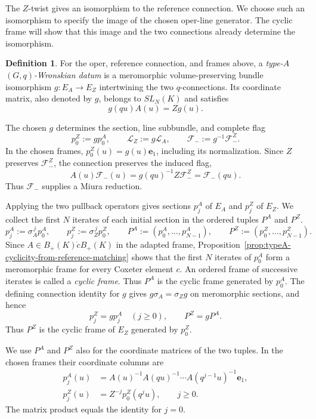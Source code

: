 \documentclass[11pt,leqno]{amsart}
\numberwithin{equation}{section}
\theoremstyle{plain}
\theoremstyle{definition}
\newtheorem{definition}[theorem]{Definition}
\theoremstyle{plain}
\theoremstyle{definition}
\theoremstyle{remark}
\begin{document}
The $Z$-twist gives an isomorphism to the reference connection. We choose such an isomorphism to specify the image of the chosen oper-line generator. The cyclic frame will show that this image and the two connections already determine the isomorphism.

\begin{definition}\label{def:typeA-universal-Wronskian}
For the oper, reference connection, and frames above, a \emph{type-$A$ $(G,q)$-Wronskian datum} is a meromorphic volume-preserving bundle isomorphism $g:E_A\to E_Z$ intertwining the two $q$-connections. Its coordinate matrix, also denoted by $g$, belongs to $SL_N(K)$ and satisfies
\[
 g(qu)A(u)=Zg(u).
\]
\end{definition}
The chosen $g$ determines the section, line subbundle, and complete flag
\[
 p_0^Z:=g p_0^A,\qquad \mathcal L_Z:=g\mathcal L_A,
 \qquad \mathcal F_-:=g^{-1}\mathcal F_-^Z.
\]
In the chosen frames, $p_0^Z(u)=g(u)\mathbf e_1$, including its normalization. Since $Z$ preserves $\mathcal F_-^Z$, the connection preserves the induced flag,
\[
 A(u)\mathcal F_-(u)=g(qu)^{-1}Z\mathcal F_-^Z
                  =\mathcal F_-(qu).
\]
Thus $\mathcal F_-$ supplies a Miura reduction.

Applying the two pullback operators gives sections $p_j^A$ of $E_A$ and $p_j^Z$ of $E_Z$. We collect the first $N$ iterates of each initial section in the ordered tuples $P^A$ and $P^Z$.
\begin{equation}\label{eq:typeA-cyclic-orbits}
 p_j^A:=\sigma_A^{\,j}p_0^A,
 \qquad p_j^{Z}:=\sigma_Z^{\,j}p_0^Z,
 \qquad
 P^A:=(p_0^A,\ldots,p_{N-1}^{A}),
 \qquad P^Z:=(p_0^Z,\ldots,p_{N-1}^Z).
\end{equation}
Since $A\in B_+(K)\dot c B_+(K)$ in the adapted frame, Proposition~\ref{prop:typeA-cyclicity-from-reference-matching} shows that the first $N$ iterates of $p_0^A$ form a meromorphic frame for every Coxeter element $c$.  An ordered frame of successive iterates is called a \emph{cyclic frame}.  Thus $P^A$ is the cyclic frame generated by $p_0^A$.  The defining connection identity for $g$ gives $g\sigma_A=\sigma_Zg$ on meromorphic sections, and hence
\[
 p_j^Z=g p_j^A\quad(j\ge0),\qquad P^Z=gP^A.
\]
Thus $P^Z$ is the cyclic frame of $E_Z$ generated by $p_0^Z$.

We use $P^A$ and $P^Z$ also for the coordinate matrices of the two tuples.  In the chosen frames their coordinate columns are
\[
 \begin{aligned}
 p_j^A(u)&=A(u)^{-1}A(qu)^{-1}\cdots A(q^{j-1}u)^{-1}\mathbf e_1,\\
 p_j^Z(u)&=Z^{-j}p_0^Z(q^ju),\qquad j\ge0.
 \end{aligned}
\]
The matrix product equals the identity for $j=0$.
\end{document}
